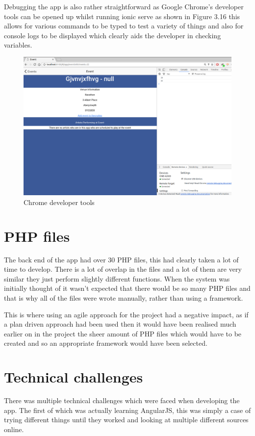 Debugging the app is also rather straightforward as Google Chrome's developer tools can be opened up whilst running ionic serve as shown in Figure 3.16 this allows for various commands to be typed to test a variety of things and also for console logs to be displayed which clearly aids the developer in checking variables.
\begin{center}
\begin{figure}[H]
\includegraphics[scale=0.45]{images/chrome2}
\caption{Chrome developer tools}
\end{figure}
\end{center}

\section{PHP files}
The back end of the app had over 30 PHP files, this had clearly taken a lot of time to develop. There is a lot of overlap in the files and a lot of them are very similar they just perform slightly different functions. When the system was initially thought of it wasn't expected that there would be so many PHP files and that is why all of the files were wrote manually, rather than using a framework. 

This is where using an agile approach for the project had a negative impact, as if a plan driven approach had been used then it would have been realised much earlier on in the project the sheer amount of PHP files which would have to be created and so an appropriate framework would have been selected.

\section{Technical challenges}
There was multiple technical challenges which were faced when developing the app. The first of which was actually learning AngularJS, this was simply a case of trying different things until they worked and looking at multiple different sources online.

